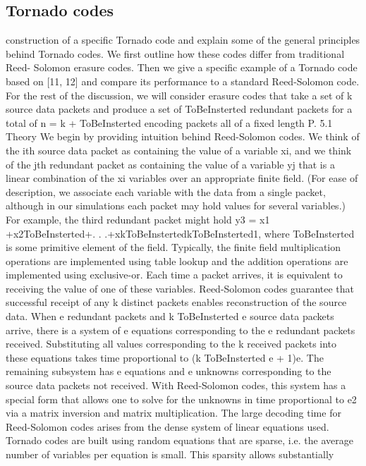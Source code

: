 \documentclass[12pt,a4paper,titlepage,twocolumn]{article}
\begin{document}
\subsection{Tornado codes}
construction
of a specific Tornado code and explain some of
the general principles behind Tornado codes. We first
outline how these codes differ from traditional Reed-
Solomon erasure codes. Then we give a specific example
of a Tornado code based on [11, 12] and compare
its performance to a standard Reed-Solomon code. For
the rest of the discussion, we will consider erasure codes
that take a set of k source data packets and produce a
set of ToBeInsterted redundant packets for a total of n = k + ToBeInsterted encoding
packets all of a fixed length P.
5.1 Theory
We begin by providing intuition behind Reed-Solomon
codes. We think of the ith source data packet as containing
the value of a variable xi, and we think of the jth
redundant packet as containing the value of a variable
yj that is a linear combination of the xi variables over an
appropriate finite field. (For ease of description, we associate
each variable with the data from a single packet,
although in our simulations each packet may hold values
for several variables.) For example, the third redundant
packet might hold y3 = x1 +x2ToBeInsterted+. . .+xkToBeInstertedkToBeInsterted1, where
ToBeInsterted is some primitive element of the field. Typically, the
finite field multiplication operations are implemented
using table lookup and the addition operations are implemented
using exclusive-or. Each time a packet arrives,
it is equivalent to receiving the value of one of
these variables.
Reed-Solomon codes guarantee that successful receipt
of any k distinct packets enables reconstruction
of the source data. When e redundant packets and
k ToBeInsterted e source data packets arrive, there is a system of
e equations corresponding to the e redundant packets
received. Substituting all values corresponding to the
k received packets into these equations takes time proportional
to (k ToBeInsterted e + 1)e. The remaining subsystem
has e equations and e unknowns corresponding to the
source data packets not received. With Reed-Solomon
codes, this system has a special form that allows one to
solve for the unknowns in time proportional to e2 via a
matrix inversion and matrix multiplication.
The large decoding time for Reed-Solomon codes
arises from the dense system of linear equations used.
Tornado codes are built using random equations that
are sparse, i.e. the average number of variables per
equation is small. This sparsity allows substantially
\end{document}
